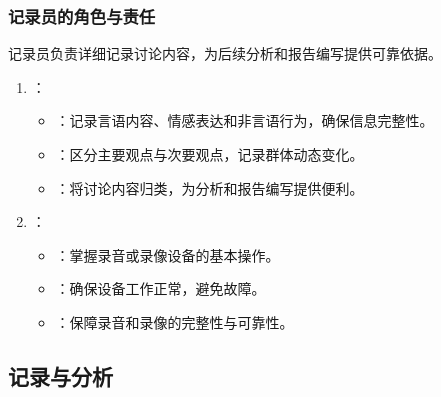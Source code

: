 \documentclass[letterpaper,10pt,english]{sphinxmanual}
\begin{document}
\subsubsection{记录员的角色与责任}
\label{\detokenize{user-research/focus-group:id20}}
\sphinxAtStartPar
记录员负责详细记录讨论内容，为后续分析和报告编写提供可靠依据。
\begin{enumerate}
%
\item {} 
\sphinxAtStartPar
{}：
\begin{itemize}
\item {} 
\sphinxAtStartPar
{}：记录言语内容、情感表达和非言语行为，确保信息完整性。

\item {} 
\sphinxAtStartPar
{}：区分主要观点与次要观点，记录群体动态变化。

\item {} 
\sphinxAtStartPar
{}：将讨论内容归类，为分析和报告编写提供便利。

\end{itemize}

\item {} 
\sphinxAtStartPar
{}：
\begin{itemize}
\item {} 
\sphinxAtStartPar
{}：掌握录音或录像设备的基本操作。

\item {} 
\sphinxAtStartPar
{}：确保设备工作正常，避免故障。

\item {} 
\sphinxAtStartPar
{}：保障录音和录像的完整性与可靠性。

\end{itemize}

\end{enumerate}


\subsection{记录与分析}
\label{\detokenize{user-research/focus-group:id21}}
\end{document}
